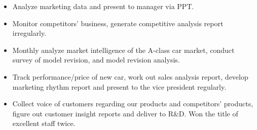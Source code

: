 \documentclass[10pt,a4paper]{altacv}
\begin{document}
\divider

\begin{itemize}
\item Analyze marketing data and present to manager via PPT.
\item Monitor competitors' business, generate competitive analysis report irregularly.
\item Monthly analyze market intelligence of the A-class car market, conduct survey of model revision, and model revision analysis.
\item Track performance/price of new car, work out sales analysis report, develop marketing rhythm report and present to the vice president regularly.
\item Collect voice of customers regarding our products and competitors' products, figure out customer insight reports and deliver to R\&D. Won the title of excellent staff twice.
\end{itemize}
\end{document}
